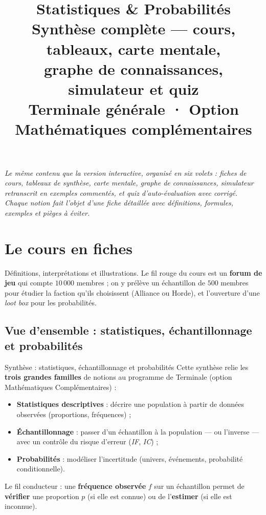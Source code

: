 \documentclass[11pt,a4paper]{article}
\title{{\sffamily\bfseries Statistiques \& Probabilités}\\[4pt]
	{\large\sffamily Synthèse complète — cours, tableaux, carte mentale,\\
		graphe de connaissances, simulateur et quiz}\\[10pt]
	{\small Terminale générale · Option Mathématiques complémentaires}}
\author{}
\date{}
\newcommand{\IF}{\textit{IF}}
\newcommand{\IC}{\textit{IC}}
\begin{document}
	\maketitle
	\vspace{-1.5em}
	\begin{center}
		\begin{minipage}{0.86\textwidth}
			\small\itshape Le même contenu que la version interactive, organisé en six volets :
			fiches de cours, tableaux de synthèse, carte mentale, graphe de connaissances,
			simulateur retranscrit en exemples commentés, et quiz d'auto-évaluation avec corrigé.
			Chaque notion fait l'objet d'une fiche détaillée avec définitions, formules,
			exemples et pièges à éviter.
		\end{minipage}
	\end{center}
	
	\tableofcontents
	\newpage
	
	\section{Le cours en fiches}
	
	Définitions, interprétations et illustrations. Le fil rouge du cours est un
	\textbf{forum de jeu} qui compte $10\,000$ membres ; on y prélève un échantillon
	de $500$ membres pour étudier la faction qu'ils choisissent (Alliance ou Horde),
	et l'ouverture d'une \emph{loot box} pour les probabilités.
	
	\subsection{Vue d'ensemble : statistiques, échantillonnage et probabilités}
	
	\begin{fiche}{Synthèse : statistiques, échantillonnage et probabilités}
		Cette synthèse relie les \textbf{trois grandes familles} de notions au programme
		de Terminale (option Mathématiques Complémentaires) :
		\begin{itemize}
			\item \textbf{Statistiques descriptives} : décrire une population à partir de
			données observées (proportions, fréquences) ;
			\item \textbf{Échantillonnage} : passer d'un échantillon à la population — ou
			l'inverse — avec un contrôle du risque d'erreur (\IF{}, \IC{}) ;
			\item \textbf{Probabilités} : modéliser l'incertitude (univers, événements,
			probabilité conditionnelle).
		\end{itemize}
		Le fil conducteur : une \textbf{fréquence observée} $f$ sur un échantillon permet
		de \textbf{vérifier} une proportion $p$ (si elle est connue) ou de
		l'\textbf{estimer} (si elle est inconnue).
	\end{fiche}
	
\end{document}
